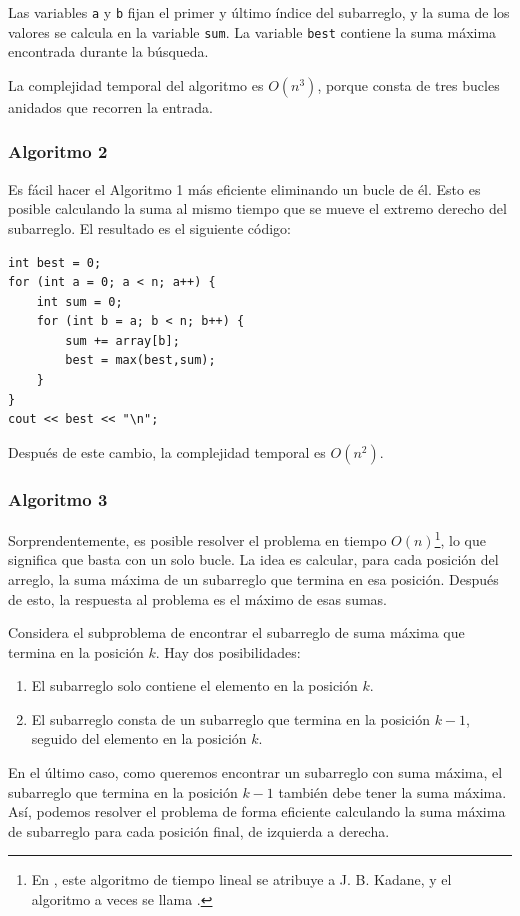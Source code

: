 Las variables \texttt{a} y \texttt{b} fijan el primer y
último índice del subarreglo,
y la suma de los valores se calcula en la variable \texttt{sum}.
La variable \texttt{best} contiene la suma máxima encontrada durante la búsqueda.

La complejidad temporal del algoritmo es $O(n^3)$,
porque consta de tres bucles anidados
que recorren la entrada.

\subsubsection{Algoritmo 2}

Es fácil hacer el Algoritmo 1 más eficiente
eliminando un bucle de él.
Esto es posible calculando la suma al mismo
tiempo que se mueve el extremo derecho del subarreglo.
El resultado es el siguiente código:

\begin{lstlisting}
int best = 0;
for (int a = 0; a < n; a++) {
    int sum = 0;
    for (int b = a; b < n; b++) {
        sum += array[b];
        best = max(best,sum);
    }
}
cout << best << "\n";
\end{lstlisting}
Después de este cambio, la complejidad temporal es $O(n^2)$.

\subsubsection{Algoritmo 3}

Sorprendentemente, es posible resolver el problema
en tiempo $O(n)$\footnote{En \cite{ben86}, este algoritmo de tiempo lineal
se atribuye a J. B. Kadane, y el algoritmo a veces
se llama  .}, lo que significa
que basta con un solo bucle.
La idea es calcular, para cada posición del arreglo,
la suma máxima de un subarreglo que termina en esa posición.
Después de esto, la respuesta al problema es el
máximo de esas sumas.

Considera el subproblema de encontrar el subarreglo de suma máxima
que termina en la posición $k$.
Hay dos posibilidades:
\begin{enumerate}
\item El subarreglo solo contiene el elemento en la posición $k$.
\item El subarreglo consta de un subarreglo que termina
en la posición $k-1$, seguido del elemento en la posición $k$.
\end{enumerate}

En el último caso, como queremos
encontrar un subarreglo con suma máxima,
el subarreglo que termina en la posición $k-1$
también debe tener la suma máxima.
Así, podemos resolver el problema de forma eficiente
calculando la suma máxima de subarreglo
para cada posición final, de izquierda a derecha.

